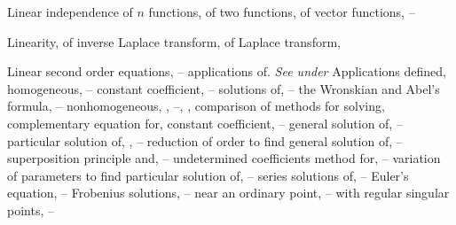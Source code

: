 \begin{theindex}
  \item Linear independence \pageref{thmtype:5.1.3}
    \subitem of $n$ functions, \pageref{thmtype:9.1.2}
    \subitem of two functions, \pageref{thmtype:5.1.3}
    \subitem of vector functions, \pageref{eq:10.3.2}--\pageref{eq:10.3.5}

  \item Linearity,
    \subitem of inverse Laplace transform, \pageref{thmtype:8.2.1}
    \subitem of Laplace transform, \pageref{thmtype:8.1.2}

  \item Linear second order equations, \pageref{eq:5.1.1}--\pageref{exer:5.7.39}
    \subitem applications of. \emph{See under} Applications
    \subitem defined, \pageref{eq:5.1.2}
    \subitem homogeneous, \pageref{eq:5.1.1}--\pageref{eq:5.3.1}
      \subsubitem constant coefficient, \pageref{eq:5.2.1}--\pageref{eq:5.1.31}
      \subsubitem solutions of, \pageref{eq:5.1.1}--\pageref{thmtype:5.1.2}
      \subsubitem the Wronskian and Abel's formula, \pageref{eq:5.1.21}--\pageref{thmtype:5.1.6}
    \subitem nonhomogeneous, \pageref{eq:5.1.1}, \pageref{eq:5.3.1}--\pageref{exer:5.7.39}, \pageref{eq:9.1.2}, \pageref{thmtype:9.1.5}
      \subsubitem comparison of methods for solving, \pageref{exer:5.1.1}
      \subsubitem complementary equation for, \pageref{eq:5.3.2}
      \subsubitem constant coefficient, \pageref{eq:5.4.1}--\pageref{eq:5.6.1}
      \subsubitem general solution of, \pageref{thmtype:5.3.2}--\pageref{thmtype:5.3.3}
      \subsubitem particular solution of, \pageref{eq:5.3.2}, \pageref{thmtype:5.3.3}--\pageref{exer:5.3.1}
      \subsubitem reduction of order to find general solution of, \pageref{eq:5.6.1}--\pageref{exer:5.6.40}
      \subsubitem superposition principle and, \pageref{thmtype:5.3.3}--\pageref{exer:5.3.1}
      \subsubitem undetermined coefficients method for, \pageref{eq:5.4.1}--\pageref{eq:5.6.1}
      \subsubitem variation of parameters to find particular solution of, \pageref{eq:5.7.1}--\pageref{exer:5.7.39}
    \subitem series solutions of, \pageref{thmtype:7.1.1}--\pageref{exer:7.7.48}
      \subsubitem Euler's equation, \pageref{thmtype:7.4.2}--\pageref{exer:7.4.23}
      \subsubitem Frobenius solutions, \pageref{eq:7.5.1}--\pageref{exer:7.7.48}
      \subsubitem near an ordinary point, \pageref{eq:7.2.1}--\pageref{exer:7.3.29}
    \subitem with regular singular points, \pageref{eq:7.4.1}--\pageref{exer:7.4.23}


\end{theindex}
